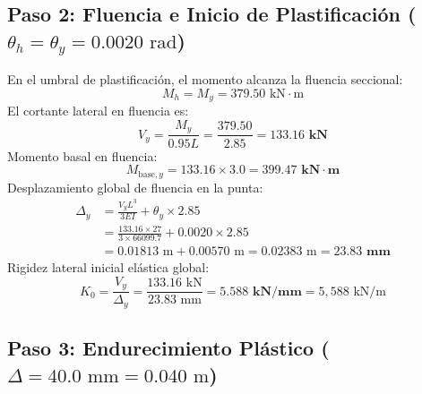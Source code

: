 \documentclass[11pt,letterpaper]{article}
\begin{document}
\subsection{Paso 2: Fluencia e Inicio de Plastificación (\texorpdfstring{$\theta_h = \theta_y = 0.0020\text{ rad}$}{theta = 0.0020 rad})}

\begin{examplebox}
En el umbral de plastificación, el momento alcanza la fluencia seccional:
\begin{equation}
M_h = M_y = 379.50\text{ kN}\cdot\text{m}
\end{equation}
El cortante lateral en fluencia es:
\begin{equation}
V_y = \frac{M_y}{0.95 L} = \frac{379.50}{2.85} = \mathbf{133.16\text{ kN}}
\end{equation}
Momento basal en fluencia:
\begin{equation}
M_{\text{base},y} = 133.16 \times 3.0 = \mathbf{399.47\text{ kN}\cdot\text{m}}
\end{equation}
Desplazamiento global de fluencia en la punta:
\begin{align}
\Delta_y &= \frac{V_y L^3}{3 E I} + \theta_y \times 2.85 \nonumber\\
&= \frac{133.16 \times 27}{3 \times 66099.7} + 0.0020 \times 2.85 \nonumber\\
&= 0.01813\text{ m} + 0.00570\text{ m} = 0.02383\text{ m} = \mathbf{23.83\text{ mm}}
\end{align}
Rigidez lateral inicial elástica global:
\begin{equation}
K_0 = \frac{V_y}{\Delta_y} = \frac{133.16\text{ kN}}{23.83\text{ mm}} = \mathbf{5.588\text{ kN/mm}} = 5,588\text{ kN/m}
\end{equation}
\end{examplebox}

\subsection{Paso 3: Endurecimiento Plástico (\texorpdfstring{$\Delta = 40.0\text{ mm} = 0.040\text{ m}$}{Delta = 40.0 mm})}
\end{document}
